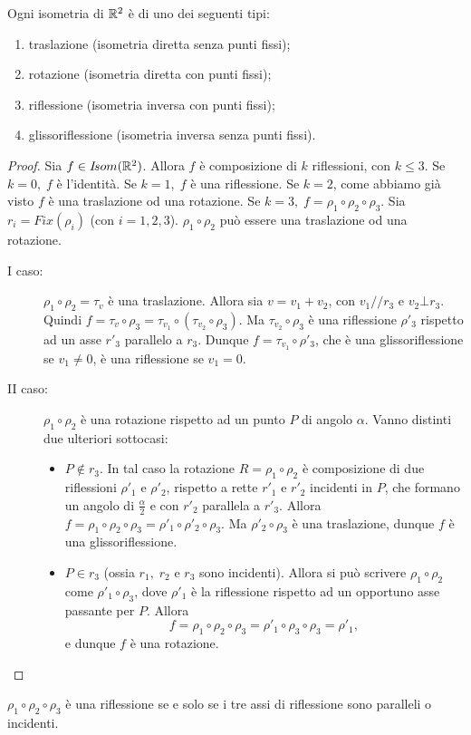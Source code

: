  \begin{theorem}
 
Ogni isometria di $\mathbb R^2$ è di uno dei seguenti tipi:
 \begin{enumerate}[label=\bf\Roman*)]
  \item traslazione (isometria diretta senza punti fissi);
  \item rotazione (isometria diretta con punti fissi);
  \item riflessione (isometria inversa con punti fissi);
  \item glissoriflessione (isometria inversa senza punti fissi).
 \end{enumerate} 
 \end{theorem}
 \begin{proof}
 Sia $f\in I\!som( \mathbb R^2)$. Allora $f$ è composizione di $k$ riflessioni, con
 $k\le 3$.
 Se $k=0,\; f$ è l'identità.
 Se $k=1,\; f$ è una riflessione.
 Se $k=2$, come abbiamo già visto $f$ è una traslazione od una rotazione.
 Se $k=3,\; f=\rho_1\circ\rho_2\circ\rho_3$. Sia $r_i=Fix(\rho_i)$ (con $i=1,2,3$).
 $\rho_1\circ\rho_2$ può essere una traslazione od una rotazione.
 \begin{description}
 \item[I caso:] $\rho_1\circ\rho_2=\tau_v$ è una traslazione.
 Allora sia $v=v_1+v_2$, con $v_1//r_3$ e $v_2\bot r_3$.
 Quindi $f=\tau_v\circ\rho_3=\tau_{v_1}\circ(\tau_{v_2}\circ\rho_3)$. Ma $\tau_{v_2}\circ\rho_3$
 è una riflessione
 $\rho'_3$ rispetto ad un asse $r'_3$ parallelo a $r_3$.
 Dunque $f=\tau_{v_1}\circ\rho'_3$, che è una glissoriflessione se $v_1\ne 0$, è una riflessione se 
 $v_1=0$.
 \item[II caso:] $\rho_1\circ\rho_2$ è una rotazione rispetto ad un punto $P$ di angolo $\alpha$.
 Vanno distinti due ulteriori sottocasi:
 \begin{itemize}
  \item $P\notin r_3$. In tal caso la rotazione $R=\rho_1\circ\rho_2$ è composizione di due riflessioni
  $\rho'_1$
  e $\rho'_2$, rispetto a rette $r'_1$ e $r'_2$ incidenti in $P$,
  che formano un angolo di $\frac{\alpha}{2}$ e con $r'_2$ parallela a $r'_3$.
  Allora $f=\rho_1\circ\rho_2\circ\rho_3=\rho'_1\circ\rho'_2\circ\rho_3$. Ma
  $\rho'_2\circ\rho_3$
  è una traslazione, dunque $f$ è una glissoriflessione.
  \item $P\in r_3$ (ossia $r_1,\; r_2$ e $r_3$ sono incidenti). Allora si può scrivere
  $\rho_1\circ\rho_2$ come $\rho'_1\circ\rho_3$, dove $\rho'_1$ è la riflessione rispetto ad un
  opportuno asse passante per $P$.
  Allora $$f=\rho_1\circ\rho_2\circ\rho_3=\rho'_1\circ\rho_3\circ\rho_3=\rho'_1,$$ e dunque $f$ è una rotazione. 
 \end{itemize}
 \end{description}
  \end{proof}
 \begin{remark}
 $\rho_1\circ\rho_2\circ\rho_3$ è una riflessione se e solo se i tre assi di riflessione sono paralleli
 o incidenti.
 \end{remark}
 
